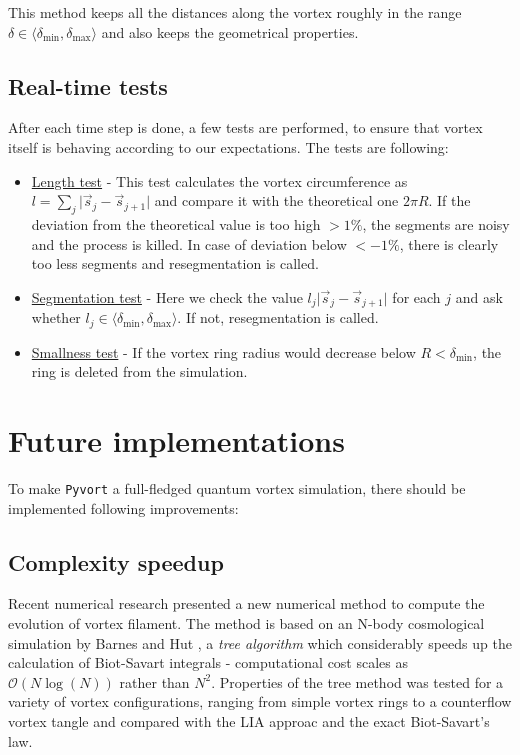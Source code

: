 This method keeps all the distances along the vortex roughly in the range $\delta \in \langle \delta_{\text{min}}, \delta_{\text{max}} \rangle$ and also keeps the geometrical properties.

\subsection*{Real-time tests}

After each time step is done, a few tests are performed, to ensure that vortex itself is behaving according to our expectations. The tests are following:

\begin{itemize}
	\item \underline{Length test} - This test calculates the vortex circumference as $l = \sum_j \vert \vec{s}_j - \vec{s}_{j+1} \vert$ and compare it with the theoretical one $2\pi R$. If the deviation from the theoretical value is too high $>1\%$, the segments are noisy and the process is killed. In case of deviation below $<-1\%$, there is clearly too less segments and resegmentation is called.

	\item \underline{Segmentation test} - Here we check the value $l_j \vert \vec{s}_j - \vec{s}_{j+1} \vert$ for each $j$ and ask whether $l_j \in \langle \delta_{\text{min}}, \delta_{\text{max}} \rangle$. If not, resegmentation is called.

	\item \underline{Smallness test} - If the vortex ring radius would decrease below $R < \delta_{\text{min}}$, the ring is deleted from the simulation.
\end{itemize}

\section{Future implementations}

To make \texttt{Pyvort} a full-fledged quantum vortex simulation, there should be implemented following improvements:

\subsection*{Complexity speedup}

Recent numerical research presented \cite{tree_alg} a new numerical method to compute the evolution of vortex filament. The method is based on an N-body cosmological simulation by Barnes and Hut \cite{barnes}, a \textit{tree algorithm} which considerably speeds up the calculation of Biot-Savart integrals - computational cost scales as $\mathcal{O}(N \log(N))$ rather than $N^2$. Properties of the tree method was tested for a variety of vortex configurations, ranging from simple vortex rings to a counterflow vortex tangle and compared with the LIA approac and the exact Biot-Savart's law.

